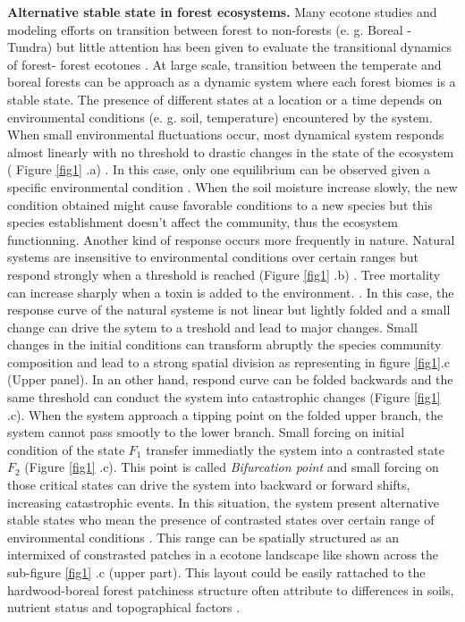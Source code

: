 \textbf{Alternative stable state in forest ecosystems.}  Many ecotone studies
and modeling efforts on transition between forest to non-forests (e. g. Boreal
- Tundra) \cite{Scheffer2012,Scheffer2001,Hirota2011,Messaoud2007} but little
attention has been given to evaluate the transitional dynamics of forest-
forest ecotones \cite{Goldblum2010,Graignic2013}. At large scale, transition
between  the temperate and boreal forests can be approach as a dynamic system
where each forest biomes is a stable state. The presence of different states
at a location or a time depends on environmental conditions (e. g. soil,
temperature) encountered by the system. When small environmental fluctuations
occur, most dynamical system responds almost linearly with no threshold to
drastic changes in the state of the ecosystem ( Figure \ref{fig1} .a)
\cite{Scheffer2001,Scheffer2009}. In this case, only one equilibrium can be
observed given a specific environmental condition
\cite{Scheffer2001,Scheffer2009,scheffer2009critical}.  When the soil moisture
increase slowly, the new condition obtained might cause favorable conditions
to a new species but this species establishment doesn't affect the community,
thus the ecosystem functionning. Another kind of response occurs more
frequently in nature.  Natural systems are insensitive to environmental
conditions over certain ranges but respond strongly when a threshold is
reached (Figure \ref{fig1} .b) \cite{scheffer2009critical}. Tree mortality can
increase sharply when a toxin is added to the environment.
\cite{scheffer2009critical}. In this case, the response curve of the natural
systeme is not linear but lightly folded and a small change can drive the
sytem to a treshold and lead to major changes. Small changes in the initial
conditions can transform abruptly the species community composition and lead
to a strong spatial division as representing in figure \ref{fig1}.c (Upper
panel). In an other hand, respond curve can be folded backwards and the same
threshold can conduct the system into catastrophic changes (Figure \ref{fig1}
.c).  When the system approach a tipping point on the folded upper branch, the
system cannot pass smootly to the lower branch. Small forcing on initial
condition of the state $F_1$ transfer immediatly the system into a contrasted
state $F_2$ (Figure \ref{fig1} .c). This point is called \textit{Bifurcation
point} and small forcing on those critical states can drive the system into
backward or forward shifts, increasing catastrophic events. In this situation,
the system present alternative stable states who mean the presence of
contrasted states over certain range of environmental conditions
\cite{scheffer2009critical}. This range can be spatially structured as an
intermixed of constrasted patches in a ecotone landscape like shown across the
sub-figure \ref{fig1} .c (upper part). This layout could be easily rattached
to the hardwood-boreal forest patchiness structure often attribute to
differences in soils, nutrient status and topographical factors
\cite{Society2014}.\\


